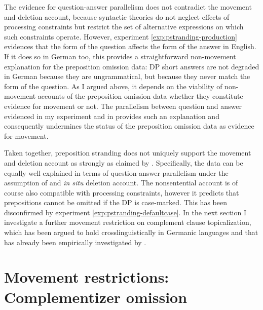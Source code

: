 The evidence for question-answer parallelism does not contradict the movement and deletion account, because syntactic theories do not neglect effects of processing constraints but restrict the set of alternative expressions on which such constraints operate. However, experiment \ref{exp:pstranding-production} evidences that the form of the question affects the form of the answer in English. If it does so in German too, this provides a straightforward non-movement explanation for the preposition omission data: DP short answers are not degraded in German because they are ungrammatical, but because they never match the form of the question. As I argued above, it depends on the viability of non-movement accounts of the preposition omission data whether they constitute evidence for movement or not. The parallelism between question and answer evidenced in my experiment and in \citet{nykiel2017} provides such an explanation and consequently undermines the status of the preposition omission data as evidence for movement.

Taken together, preposition stranding does not uniquely support the movement and deletion account as strongly as claimed by \citet{merchant2004}. Specifically, the data can be equally well explained in terms of question-answer parallelism under the assumption of and \textit{in situ} deletion account. The nonsentential account is of course also compatible with processing constraints, however it predicts that prepositions cannot be omitted if the DP is case-marked. This has been disconfirmed by experiment \ref{exp:pstranding-defaultcase}. In the next section I investigate a further movement restriction on complement clause topicalization, which has been argued to hold crosslinguistically in Germanic languages \citep{webelhuth1992} and that has already been empirically investigated by \citet{merchant.etal2013}.


\section{Movement restrictions: Complementizer omission}
\label{sec:ccs}

